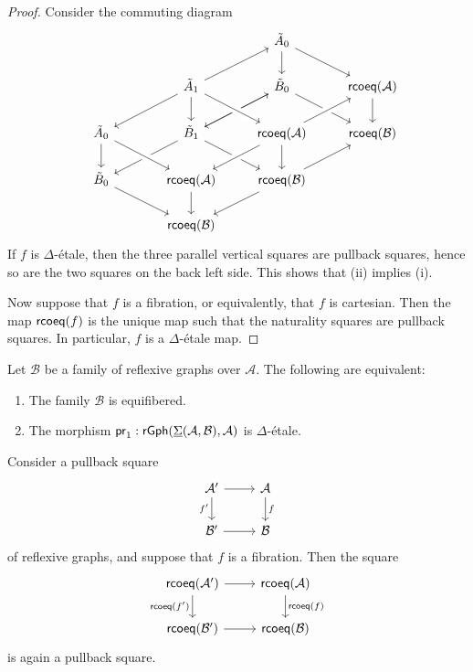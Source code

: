 \begin{proof}
Consider the commuting diagram
\begin{equation*}
\begin{tikzcd}
& & \pts{\tilde A} \arrow[d] \arrow[dr] \\
& \edg{\tilde A} \arrow[dl] \arrow[d] \arrow[ur] & \pts{\tilde B} \arrow[dl] \arrow[dr] & \rcoeq(\mathcal{A}) \arrow[d] \\
\pts{\tilde A} \arrow[d] & \edg{\tilde B} \arrow[dl] \arrow[dr] \arrow[ur] & \rcoeq(\mathcal{A}) \arrow[from=ul,crossing over] \arrow[dl,crossing over] \arrow[d] \arrow[ur,crossing over] & \rcoeq(\mathcal{B}) \\
\pts{\tilde B} \arrow[dr] & \rcoeq(\mathcal{A}) \arrow[d] \arrow[from=ul,crossing over] & \rcoeq(\mathcal{B}) \arrow[dl] \arrow[ur] \\
\phantom{\rcoeq(\mathcal{B})} & \rcoeq(\mathcal{B})
\end{tikzcd}
\end{equation*}
If $f$ is $\Delta$-\'etale, then the three parallel vertical squares are pullback squares, hence so are the two squares on the back left side. This shows that (ii) implies (i). 

Now suppose that $f$ is a fibration, or equivalently, that $f$ is cartesian. Then the map $\mathsf{rcoeq}(f)$ is the unique map such that the naturality squares are pullback squares. In particular, $f$ is a $\Delta$-\'etale map.
\end{proof}

\begin{cor}
Let $\mathcal{B}$ be a family of reflexive graphs over $\mathcal{A}$. The following are equivalent:
\begin{enumerate}
\item The family $\mathcal{B}$ is equifibered.
\item The morphism $\mathsf{pr}_{1} : \mathsf{rGph}(\underline{\Sigma}(\mathcal{A},\mathcal{B}),\mathcal{A})$ is $\Delta$-\'etale.
\end{enumerate}
\end{cor}

\begin{prp}
Consider a pullback square
\begin{equation*}
\begin{tikzcd}
\mathcal{A}' \arrow[r] \arrow[d,swap,"{f'}"] & \mathcal{A} \arrow[d,"f"] \\
\mathcal{B}' \arrow[r] & \mathcal{B}
\end{tikzcd}
\end{equation*}
of reflexive graphs, and suppose that $f$ is a fibration. Then the square
\begin{equation*}
\begin{tikzcd}
\rcoeq(\mathcal{A}') \arrow[r] \arrow[d,swap,"\rcoeq({f'})"] & \rcoeq(\mathcal{A}) \arrow[d,"\rcoeq(f)"] \\
\rcoeq(\mathcal{B}') \arrow[r] & \rcoeq(\mathcal{B})
\end{tikzcd}
\end{equation*}
is again a pullback square.
\end{prp}

